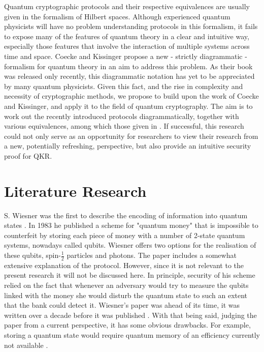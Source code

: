 \documentclass[%
 reprint,
nofootinbib,
 amsmath,amssymb,
 aps,
]{revtex4-2}
\begin{document}
Quantum cryptographic protocols and their respective equivalences are usually given in the formalism of Hilbert spaces. Although experienced quantum physicists will have no problem understanding protocols in this formalism, it fails to expose many of the features of quantum theory in a clear and intuitive way, especially those features that involve the interaction of multiple systems across time and space. Coecke and Kissinger \cite{Coecke2017} propose a new - strictly diagrammatic - formalism for quantum theory in an aim to address this problem. As their book was released only recently, this diagrammatic notation has yet to be appreciated by many quantum physicists. Given this fact, and the rise in complexity and necessity of cryptographic methods, we propose to build upon the work of Coecke and Kissinger, and apply it to the field of quantum cryptography. The aim is to work out the recently introduced protocols diagrammatically, together with various equivalences, among which those given in \cite{cryptoeprint:2019:875}. If successful, this research could not only serve as an opportunity for researchers to view their research from a new, potentially refreshing, perspective, but also provide an intuitive security proof for QKR.





\section{Literature Research}

S. Wiesner was the first to describe the encoding of information into quantum states \cite{WeisnerConjugateCoding}. In 1983 he published a scheme for "quantum money" that is impossible to counterfeit by storing each piece of money with a number of 2-state quantum systems, nowadays called qubits. Wiesner offers two options for the realisation of these qubits, spin-$\frac{1}{2} $ particles and photons. The paper includes a somewhat extensive explanation of the protocol. However, since it is not relevant to the present research it will not be discussed here. In principle, security of his scheme relied on the fact that whenever an adversary would try to measure the qubits linked with the money she would disturb the quantum state to such an extent that the bank could detect it. Wiesner's paper was ahead of its time, it was written over a decade before it was published \cite{Brassard2005}. With that being said, judging the paper from a current perspective, it has some obvious drawbacks. For example, storing a quantum state would require quantum memory of an efficiency currently not available \cite{Wang2019, lvovsky2009optical}. 
\end{document}
